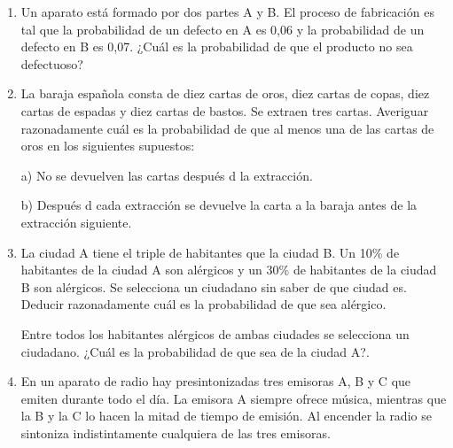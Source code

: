 \begin{adjustwidth}{5mm}{5mm}

\begin{enumerate}[PB. 1. ]


\item Un aparato está formado por dos partes A y B. El proceso de fabricación es tal que la probabilidad de un defecto en A es 0,06 y la probabilidad de un defecto en B es 0,07. ¿Cuál es la probabilidad de que el producto no sea defectuoso? 

\hspace{-1cm}\vspace{1cm}



\item La baraja española consta de diez cartas de oros, diez cartas de copas, diez cartas de espadas y diez cartas de bastos. Se extraen tres cartas. Averiguar razonadamente cuál es la probabilidad de que al menos una de las cartas de oros en los siguientes supuestos: 

a) No se devuelven las cartas después d la extracción.

b) Después d cada extracción se devuelve la carta a la baraja antes de la extracción siguiente. 

\hspace{-1cm}\vspace{1cm}




\item La ciudad A tiene el triple de habitantes que la ciudad B. Un 10\% de habitantes de la ciudad A son alérgicos y un 30\% de habitantes de la ciudad B son alérgicos. Se selecciona un ciudadano sin saber de que ciudad es. Deducir razonadamente cuál es la probabilidad de que sea alérgico.

Entre todos los habitantes alérgicos de ambas ciudades se selecciona un ciudadano. ¿Cuál es la probabilidad de que sea de la ciudad A?. 

\hspace{-1cm}\vspace{1cm}

\item En un aparato de radio hay presintonizadas tres emisoras A, B y C que emiten durante todo el día. La emisora A siempre ofrece música, mientras que la B y la C lo hacen la mitad de tiempo de emisión. Al encender la radio se sintoniza indistintamente cualquiera de las tres emisoras. 


\end{enumerate}
\end{adjustwidth}
